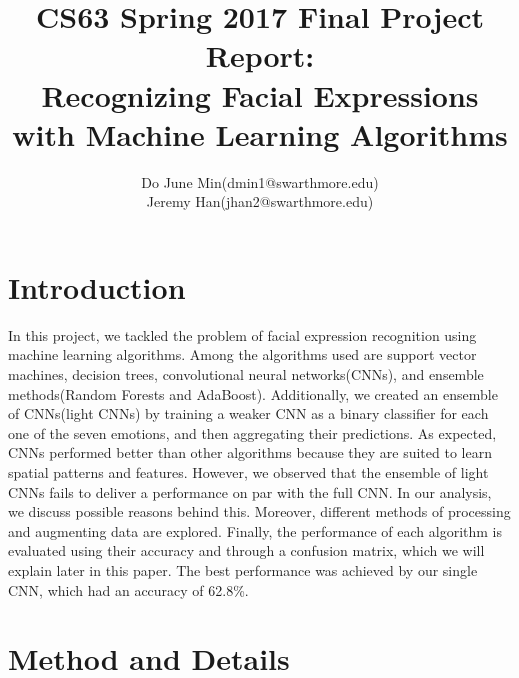 \documentclass[11pt]{article}
\title{CS63 Spring 2017 Final Project Report:\\Recognizing Facial Expressions with Machine Learning Algorithms}
\author{Do June Min(dmin1@swarthmore.edu)\\
	Jeremy Han(jhan2@swarthmore.edu)}
\begin{document}
	
	\maketitle
	
	\section{Introduction}
	In this project, we tackled the problem of facial expression recognition
	using machine learning algorithms. Among the algorithms used are support vector machines, decision trees, convolutional neural networks(CNNs), and ensemble methods(Random Forests and AdaBoost). Additionally, we created an ensemble of CNNs(light CNNs) by training a weaker CNN as a binary classifier for each one of the seven emotions, and then aggregating their predictions. As expected, CNNs performed better than other algorithms because they are suited to learn spatial patterns and features. However, we observed that the ensemble of light CNNs fails to deliver a performance on par with the full CNN. In our analysis, we discuss possible reasons behind this. Moreover, different methods of processing and augmenting data are explored. Finally, the performance of each algorithm is evaluated using their accuracy and through a confusion matrix, which we will explain later in this paper. The best performance was achieved by our single CNN, which had an accuracy of 62.8\%.
	
	\section{Method and Details}
\end{document}
